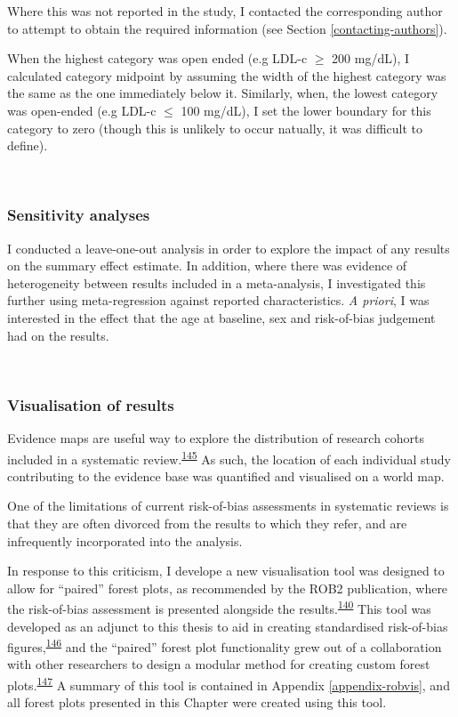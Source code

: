 \documentclass[a4paper, twoside]{templates/ociamthesis}
\begin{document}
Where this was not reported in the study, I contacted the corresponding author to attempt to obtain the required information (see Section \ref{contacting-authors}).

When the highest category was open ended (e.g LDL-c \(\geqslant\) 200 mg/dL), I calculated category midpoint by assuming the width of the highest category was the same as the one immediately below it. Similarly, when, the lowest category was open-ended (e.g LDL-c \(\leqslant\) 100 mg/dL), I set the lower boundary for this category to zero (though this is unlikely to occur natually, it was difficult to define).

~

\hypertarget{sensitivity-analyses}{%
\subsubsection{Sensitivity analyses}\label{sensitivity-analyses}}

I conducted a leave-one-out analysis in order to explore the impact of any results on the summary effect estimate. In addition, where there was evidence of heterogeneity between results included in a meta-analysis, I investigated this further using meta-regression against reported characteristics. \emph{A priori}, I was interested in the effect that the age at baseline, sex and risk-of-bias judgement had on the results.

~

\hypertarget{visualisation-of-results}{%
\subsubsection{Visualisation of results}\label{visualisation-of-results}}

Evidence maps are useful way to explore the distribution of research cohorts included in a systematic review.\textsuperscript{\protect\hyperlink{ref-saran2018}{145}} As such, the location of each individual study contributing to the evidence base was quantified and visualised on a world map.

One of the limitations of current risk-of-bias assessments in systematic reviews is that they are often divorced from the results to which they refer, and are infrequently incorporated into the analysis.

In response to this criticism, I develope a new visualisation tool was designed to allow for ``paired'' forest plots, as recommended by the ROB2 publication, where the risk-of-bias assessment is presented alongside the results.\textsuperscript{\protect\hyperlink{ref-sterne2019}{140}} This tool was developed as an adjunct to this thesis to aid in creating standardised risk-of-bias figures,\textsuperscript{\protect\hyperlink{ref-mcguinness2020robvisPaper}{146}} and the ``paired'' forest plot functionality grew out of a collaboration with other researchers to design a modular method for creating custom forest plots.\textsuperscript{\protect\hyperlink{ref-zotero-14999}{147}} A summary of this tool is contained in Appendix \ref{appendix-robvis}, and all forest plots presented in this Chapter were created using this tool.
\end{document}
